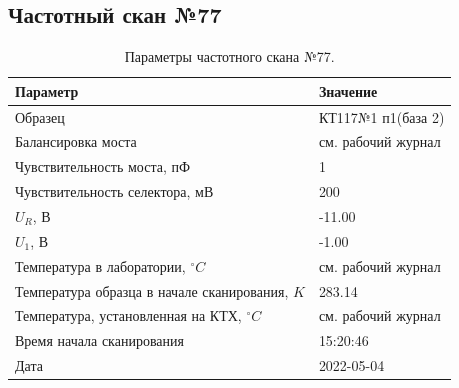 \subsection{Частотный скан №77}
\begin{table}[!ht]
    \centering
    \caption{Параметры частотного скана №77.}
    \begin{tabular}{|l|l|}
        \hline
        Параметр                                       & Значение                  \\ \hline
        Образец                                        & КТ117№1 п1(база 2)        \\ \hline
        Балансировка моста                             & см. рабочий журнал        \\ \hline
        Чувствительность моста, пФ                     & 1                         \\ \hline
        Чувствительность селектора, мВ                 & 200                       \\ \hline
        $U_R$, В                                       & -11.00                    \\ \hline
        $U_1$, В                                       & -1.00                     \\ \hline
        Температура в лаборатории, $^\circ C$          & см. рабочий журнал        \\ \hline
        Температура образца в начале сканирования, $K$ & 283.14                    \\ \hline
        Температура, установленная на КТХ, $^\circ C$  & см. рабочий журнал        \\ \hline
        Время начала сканирования                      & 15:20:46                  \\ \hline
        Дата                                           & 2022-05-04                \\ \hline
    \end{tabular}
    \label{table:frequency_scan_77}
\end{table}

